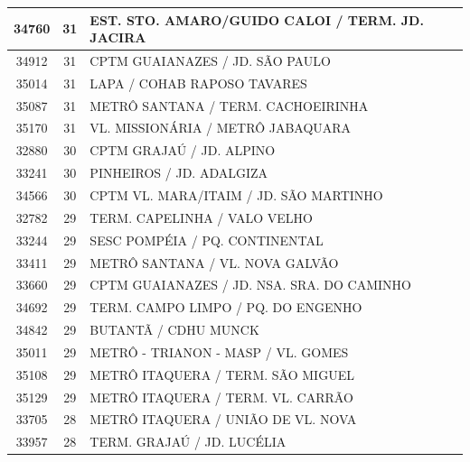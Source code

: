 \documentclass[
	12pt,				%
	oneside,			%
	a4paper,			%
	english,			%
	brazil				%
	]{abntex2ppgsi}
\begin{document}
\begin{apendicesenv}
\begin{longtable}{c|c|p{7cm}}
    34760 & 31    & EST. STO. AMARO/GUIDO CALOI / TERM. JD. JACIRA \\
\hline

    34912 & 31    & CPTM GUAIANAZES / JD. SÃO PAULO \\
\hline

    35014 & 31    & LAPA / COHAB RAPOSO TAVARES \\
\hline

    35087 & 31    & METRÔ SANTANA / TERM. CACHOEIRINHA \\
\hline

    35170 & 31    & VL. MISSIONÁRIA / METRÔ JABAQUARA \\
\hline

    32880 & 30    & CPTM GRAJAÚ / JD. ALPINO \\
\hline

    33241 & 30    & PINHEIROS / JD. ADALGIZA \\
\hline

    34566 & 30    & CPTM VL. MARA/ITAIM / JD. SÃO MARTINHO \\
\hline

    32782 & 29    & TERM. CAPELINHA / VALO VELHO \\
\hline

    33244 & 29    & SESC POMPÉIA / PQ. CONTINENTAL \\
\hline

    33411 & 29    & METRÔ SANTANA / VL. NOVA GALVÃO \\
\hline

    33660 & 29    & CPTM GUAIANAZES / JD. NSA. SRA. DO CAMINHO \\
\hline

    34692 & 29    & TERM. CAMPO LIMPO / PQ. DO ENGENHO \\
\hline

    34842 & 29    & BUTANTÃ / CDHU MUNCK \\
\hline

    35011 & 29    & METRÔ - TRIANON - MASP / VL. GOMES \\
\hline

    35108 & 29    & METRÔ ITAQUERA / TERM. SÃO MIGUEL \\
\hline

    35129 & 29    & METRÔ ITAQUERA / TERM. VL. CARRÃO \\
\hline

    33705 & 28    & METRÔ ITAQUERA / UNIÃO DE VL. NOVA \\
\hline

    33957 & 28    & TERM. GRAJAÚ / JD. LUCÉLIA \\
\hline


\end{longtable}
\end{apendicesenv}
\end{document}
